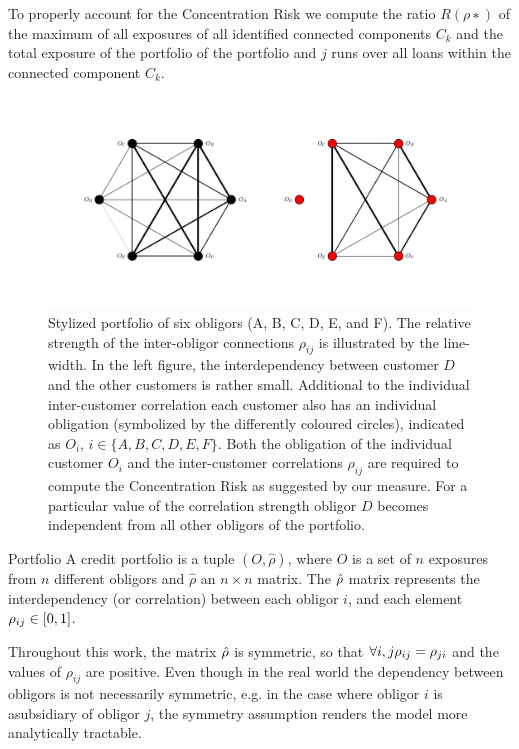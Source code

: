 To properly account for the Concentration Risk we compute the ratio $R(ρ∗)$ of the maximum of all exposures of all identified connected components $C_k$ and the total exposure of the portfolio
of the portfolio and $j$ runs over all loans within the connected component $C_k$.
\begin{figure}[tb]
	\centering
	\includegraphics[scale=0.5]{figures/ramping_parameter_example.png}
	\caption{
Stylized portfolio of six obligors (A, B, C, D, E, and F).
The relative strength of the inter-obligor connections $\rho_{ij}$ is illustrated by the line-width.
In the left figure, the interdependency between customer $D$ and the other customers is rather small.
Additional to the individual inter-customer correlation each customer also has an individual obligation (symbolized by the differently coloured circles), indicated as $O_i$, $i \in \{A, B, C, D, E, F \}$.
Both the obligation of the individual customer $O_i$ and the inter-customer correlations $\rho_{ij}$ are required to compute the Concentration Risk as suggested by our measure.
For a particular value of the correlation strength obligor $D$ becomes independent from all other obligors of the portfolio.
	}
	\label{fig:6_pf_ramping}
\end{figure}

 
 
 
\begin{definition}{Portfolio}
A credit portfolio is a tuple $(O, \hat{\rho})$, where $O$ is a set of $n$ exposures from $n$ different obligors and $\hat{\rho}$ an $n \times n$ matrix.
The $\hat{\rho}$ matrix represents the interdependency (or correlation) between each obligor $i$, and each element $\rho_{ij} \in [0,1]$.
\end{definition}

\begin{remark}
Throughout this work, the matrix $\hat{\rho}$ is symmetric, so that $\forall i,j \rho_{ij} = \rho_{ji}$ and the values of $\rho_{ij}$ are positive.
Even though in the real world the dependency between obligors is not necessarily symmetric, e.g. in the case where obligor $i$ is asubsidiary of obligor $j$, the symmetry assumption renders the model more analytically tractable.
\end{remark}



